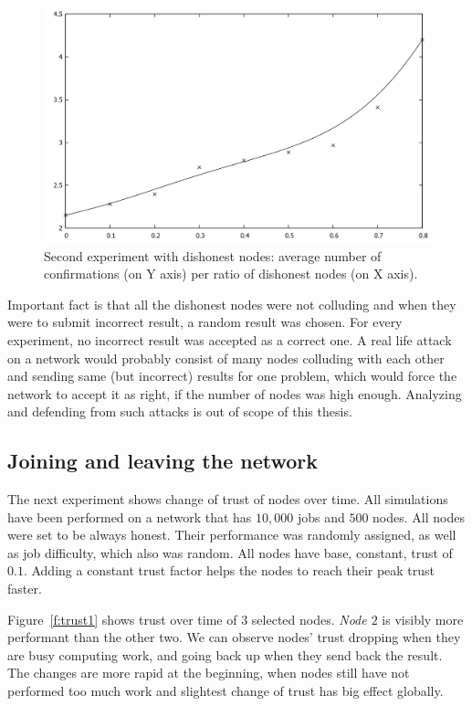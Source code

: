 \begin{figure}
\centering
\includegraphics[width=\textwidth]{diagrams/confirmations2.png}
\caption{Second experiment with dishonest nodes: average number of confirmations (on Y axis) per ratio of dishonest nodes (on X axis).}
\label{f:confirmations2}
\end{figure}

Important fact is that all the dishonest nodes were not colluding and when they were to submit incorrect result, a random result was chosen. For every experiment, no incorrect result was accepted as a correct one. A real life attack on a network would probably consist of many nodes colluding with each other and sending same (but incorrect) results for one problem, which would force the network to accept it as right, if the number of nodes was high enough. Analyzing and defending from such attacks is out of scope of this thesis.

\FloatBarrier

\subsection{Joining and leaving the network}

The next experiment shows change of trust of nodes over time. All simulations have been performed on a network that has $10,000$ jobs and $500$ nodes. All nodes were set to be always honest. Their performance was randomly assigned, as well as job difficulty, which also was random. All nodes have base, constant, trust of $0.1$. Adding a constant trust factor helps the nodes to reach their peak trust faster.

Figure~\ref{f:trust1} shows trust over time of $3$ selected nodes. \emph{Node $2$} is visibly more performant than the other two. We can observe nodes' trust dropping when they are busy computing work, and going back up when they send back the result. The changes are more rapid at the beginning, when nodes still have not performed too much work and slightest change of trust has big effect globally. 


